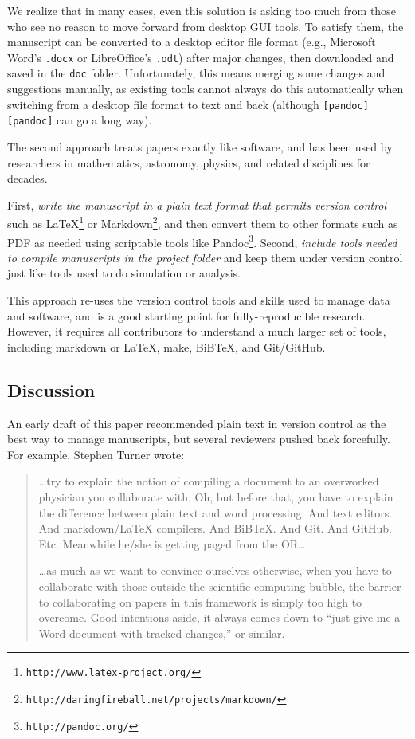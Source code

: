 \documentclass[10pt]{article}
\newcommand{\recommend}[1]{\textit{#1}}
\newcommand{\withurl}[2]{{#1}\footnote{\texttt{#2}}}
\begin{document}
We realize that in many cases, even this solution is asking too much
from those who see no reason to move forward from desktop GUI tools. To
satisfy them, the manuscript can be converted to a desktop editor file
format (e.g., Microsoft Word's \texttt{.docx} or LibreOffice's
\texttt{.odt}) after major changes, then downloaded and saved in the
\texttt{doc} folder. Unfortunately, this means merging some changes and
suggestions manually, as existing tools cannot always do this
automatically when switching from a desktop file format to text and back
(although \texttt{{[}pandoc{]}{[}pandoc{]}} can go a long way).

The second approach treats papers exactly like software, and has been
used by researchers in mathematics, astronomy, physics, and related
disciplines for decades.

First, \recommend{write the manuscript in a plain text format that
  permits version control} such as
\withurl{LaTeX}{http://www.latex-project.org/} or
\withurl{Markdown}{http://daringfireball.net/projects/markdown/}, and
then convert them to other formats such as PDF as needed using
scriptable tools like \withurl{Pandoc}{http://pandoc.org/}.  Second,
\recommend{include tools needed to compile manuscripts in the project
  folder} and keep them under version control just like tools used to
do simulation or analysis.

This approach re-uses the version control tools and skills used to
manage data and software, and is a good starting point for
fully-reproducible research. However, it requires all contributors to
understand a much larger set of tools, including markdown or LaTeX,
make, BiBTeX, and Git/GitHub.

\subsection*{Discussion}

An early draft of this paper recommended plain text in version control
as the best way to manage manuscripts, but several reviewers pushed back
forcefully. For example, Stephen Turner wrote:

\begin{quote}
{\ldots}try to explain the notion of compiling a document to an
overworked physician you collaborate with. Oh, but before that, you have
to explain the difference between plain text and word processing. And
text editors. And markdown/LaTeX compilers. And BiBTeX. And Git. And
GitHub. Etc. Meanwhile he/she is getting paged from the OR{\ldots}

{\ldots}as much as we want to convince ourselves otherwise, when you
have to collaborate with those outside the scientific computing bubble,
the barrier to collaborating on papers in this framework is simply too
high to overcome. Good intentions aside, it always comes down to ``just
give me a Word document with tracked changes,'' or similar.
\end{quote}
\end{document}
